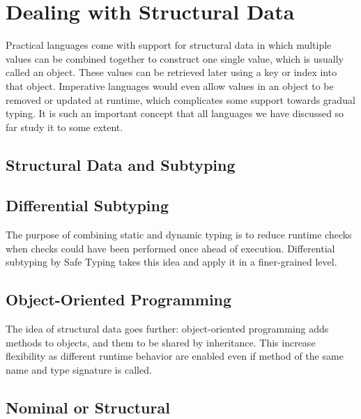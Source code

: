 \section{Dealing with Structural Data}

Practical languages come with support for structural data in which multiple values
can be combined together to construct one single value, which is usually called an object.
These values can be retrieved later using a key or index into that object.
Imperative languages would even allow values in an object to be removed or updated at runtime,
which complicates some support towards gradual typing.
It is such an important concept that all languages we have discussed so far study
it to some extent.


\subsection{Structural Data and Subtyping}

\subsection{Differential Subtyping}

The purpose of combining static and dynamic typing is to reduce
runtime checks when checks could have been performed once ahead of execution.
Differential subtyping by Safe Typing takes this idea and apply it in a finer-grained level.

\subsection{Object-Oriented Programming}

The idea of structural data goes further: object-oriented programming adds methods to objects,
and them to be shared by inheritance.
This increase flexibility as different runtime behavior are enabled even if method of the same name and type signature is called.

\subsection{Nominal or Structural}


